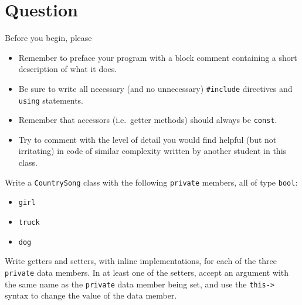 




\docCopyright


\newEvenPage

\section{Question}

Before you begin, please
\begin{itemize}
  \item Remember to preface your program with a block comment containing a
    short description of what it does.
  \item Be sure to write all necessary (and no unnecessary)
    \texttt{#include} directives and \texttt{using}
    statements.
  \item Remember that accessors (i.e.~getter methods) should always be
    \texttt{const}.
  \item Try to comment with the level of detail you would find helpful (but not
    irritating) in code of similar complexity written by another student in
    this class.
\end{itemize}

Write a \texttt{CountrySong} class with the following
\texttt{private} members, all of type \texttt{bool}:
\begin{itemize}
  \item \texttt{girl}
  \item \texttt{truck}
  \item \texttt{dog}
\end{itemize}

Write getters and setters, with inline implementations, for each of the three
\texttt{private} data members.  In at least one of the setters, accept
an argument with the same name as the \texttt{private} data member
being set, and use the \texttt{this->} syntax to change the value of
the data member.

